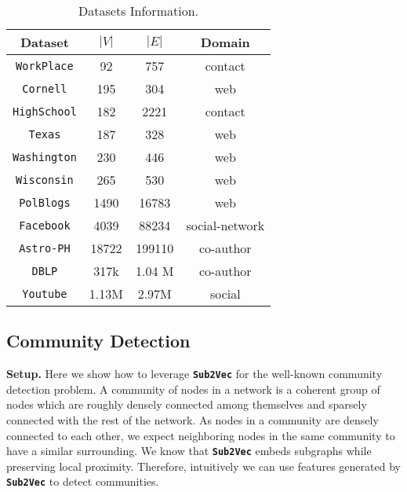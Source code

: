 \documentclass[sigconf]{acmart}
\newcommand{\alg}{{\bf {\tt Sub2Vec}}\xspace}
\newcommand{\workplace}{{\tt WorkPlace}\xspace}
\newcommand{\highschool}{{\tt HighSchool}\xspace}
\newcommand{\dblp}{{\tt DBLP}\xspace}
\newcommand{\youtube}{{\tt Youtube}\xspace}
\newcommand{\polblogs}{{\tt PolBlogs}\xspace}
\newcommand{\texas}{{\tt Texas}\xspace}
\newcommand{\wisconsin}{{\tt Wisconsin}\xspace}
\newcommand{\washington}{{\tt Washington}\xspace}
\newcommand{\cornell}{{\tt Cornell}\xspace}
\newcommand{\facebook}{{\tt Facebook}\xspace}
\newcommand{\arxiv}{{\tt Astro-PH}\xspace}
\begin{document}
{
\small
\begin{table}

\centering
\caption{\label{tab:datasets}Datasets Information.}
\begin{tabular}{|c|c|c|c|}
	\hline
 \textbf{Dataset}  & \textbf{$|V|$} & \textbf{$|E|$}  & \textbf{Domain} \\ \hline

\workplace \cite{NWS:9950811}  & 92 & 757 & contact  \\ \hline
\cornell \cite{sen:aimag08} & 195 & 304 & web\\ \hline
\highschool \cite{10.1371/journal.pone.0107878} &  182 & 2221 & contact\\ \hline
\texas \cite{sen:aimag08}  & 187 & 328 & web\\ \hline
\washington \cite{sen:aimag08}   & 230 & 446  & web\\ \hline
\wisconsin  \cite{sen:aimag08} & 265 & 530 & web\\ \hline
\polblogs  \cite{adamic2005political}& 1490 & 16783 & web\\ \hline
\facebook \cite{leskovec2012learning}  & 4039 & 88234 & social-network\\ \hline
\arxiv \cite{leskovec2007graph}  & 18722 & 199110 & co-author\\ \hline
\dblp \cite{yang2015defining} &  317k & 1.04 M & co-author \\ \hline
\youtube \cite{yang2015defining} &  1.13M & 2.97M & social\\ \hline



\end{tabular}

\end{table}
}




\subsection{Community Detection}

\par \noindent 
\textbf{Setup.} Here we show how to leverage \alg for the well-known community detection problem. A community of nodes in a network is a coherent group of nodes which are roughly densely connected among themselves and sparsely connected with the rest of the network. As nodes in a community are densely connected to each other, we expect neighboring nodes in the same community to have a similar surrounding. We know that \alg embeds subgraphs while preserving local proximity. Therefore, intuitively we can use features generated by \alg to detect communities. 
\end{document}
